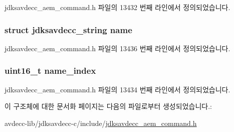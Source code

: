 jdksavdecc\+\_\+aem\+\_\+command.\+h 파일의 13432 번째 라인에서 정의되었습니다.

\subsubsection[{\texorpdfstring{name}{name}}]{\setlength{\rightskip}{0pt plus 5cm}struct {\bf jdksavdecc\+\_\+string} name}\hypertarget{structjdksavdecc__aem__command__get__name__response_a7e615b51b7768e9b59bfa450051e0f8e}{}\label{structjdksavdecc__aem__command__get__name__response_a7e615b51b7768e9b59bfa450051e0f8e}


jdksavdecc\+\_\+aem\+\_\+command.\+h 파일의 13436 번째 라인에서 정의되었습니다.

\subsubsection[{\texorpdfstring{name\+\_\+index}{name_index}}]{\setlength{\rightskip}{0pt plus 5cm}uint16\+\_\+t name\+\_\+index}\hypertarget{structjdksavdecc__aem__command__get__name__response_a898a74ada625e0b227dadb02901404e6}{}\label{structjdksavdecc__aem__command__get__name__response_a898a74ada625e0b227dadb02901404e6}


jdksavdecc\+\_\+aem\+\_\+command.\+h 파일의 13434 번째 라인에서 정의되었습니다.



이 구조체에 대한 문서화 페이지는 다음의 파일로부터 생성되었습니다.\+:\begin{DoxyCompactItemize}
\item 
avdecc-\/lib/jdksavdecc-\/c/include/\hyperlink{jdksavdecc__aem__command_8h}{jdksavdecc\+\_\+aem\+\_\+command.\+h}\end{DoxyCompactItemize}
